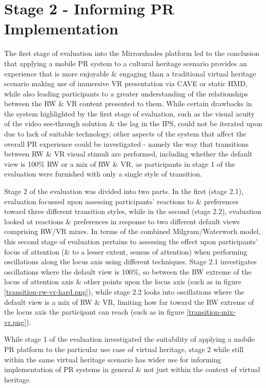 \clearpage

\section{Stage 2 - Informing PR Implementation}

The first stage of evaluation into the Mirrorshades platform led to the conclusion that applying a mobile PR system to a cultural heritage scenario provides an experience that is more enjoyable \& engaging than a traditional virtual heritage scenario making use of immersive VR presentation via CAVE or static HMD, while also leading participants to a greater understanding of the relationships between the RW \& VR content presented to them. While certain drawbacks in the system highlighted by the first stage of evaluation, such as the visual acuity of the video see-through solution \& the lag in the IPS, could not be iterated upon due to lack of suitable technology, other aspects of the system that affect the overall PR experience could be investigated - namely the way that transitions between RW \& VR visual stimuli are performed, including whether the default view is 100\% RW or a mix of RW \& VR, as participants in stage 1 of the evaluation were furnished with only a single style of transition.

Stage 2 of the evaluation was divided into two parts. In the first (stage 2.1), evaluation focussed upon assessing participants' reactions to \& preferences toward three different transition styles, while in the second (stage 2.2), evaluation looked at reactions \& preferences in response to two different default views comprising RW/VR mixes. In terms of the combined Milgram/Waterworh model, this second stage of evaluation pertains to assessing the effect upon participants' focus of attention (\& to a lesser extent, sensus of attention) when performing oscillations along the locus axis using different techniques. Stage 2.1 investigates oscillations where the default view is 100\%, so between the RW extreme of the locus of attention axis \& other points upon the locus axis (such as in figure \ref{transition-rw-vr-hard.png}), while stage 2.2 looks into oscillations where the default view is a mix of RW \& VR, limiting how far toward the RW extreme of the locus axis the participant can reach (such as in figure \ref{transition-mix-vr.png}).

While stage 1 of the evaluation investigated the suitability of applying a mobile PR platform to the particular use case of virtual heritage, stage 2 while still within the same virtual heritage scenario has wider use for informing implementation of PR systems in general \& not just within the context of virtual heritage.

